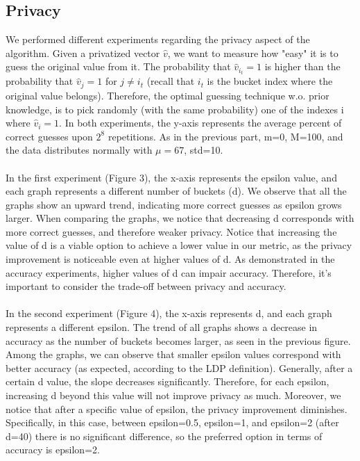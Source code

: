 \documentclass[sigconf]{acmart}
\begin{document}
\subsection{Privacy}  We performed different experiments regarding the privacy aspect of the algorithm. Given a privatized vector $\hat{v}$, we want to measure how "easy" it is to guess the original value from it. The probability that $\hat{v}_{i_t} =1$ is higher than the probability that $\hat{v}_{j} =1$ for $j \neq i_t$ (recall that $i_t$ is the bucket index where the original value belongs). Therefore, the optimal guessing technique w.o. prior knowledge, is to pick randomly (with the same probability) one of the indexes i where $\hat{v}_{i} =1$. In both experiments, the y-axis represents the average percent of correct guesses upon $2^{8}$ repetitions. As in the previous part, m=0, M=100, and the data distributes normally with $\mu=67$, std=10. \\\\
In the first experiment (Figure 3), the x-axis represents the epsilon value, and each graph represents a different number of buckets (d). We observe that all the graphs show an upward trend, indicating more correct guesses as epsilon grows larger. When comparing the graphs, we notice that decreasing d corresponds with more correct guesses, and therefore weaker privacy. Notice that increasing the value of d is a viable option to achieve a lower value in our metric, as the privacy improvement is noticeable even at higher values of d. As demonstrated in the accuracy experiments, higher values of d can impair accuracy. Therefore, it's important to consider the trade-off between privacy and accuracy.
\\\\
In the second experiment (Figure 4), the x-axis represents d, and each graph represents a different epsilon. The trend of all graphs shows a decrease in accuracy as the number of buckets becomes larger, as seen in the previous figure. Among the graphs, we can observe that smaller epsilon values correspond with better accuracy (as expected, according to the LDP definition). Generally, after a certain d value, the slope decreases significantly. Therefore, for each epsilon, increasing d beyond this value will not improve privacy as much. Moreover, we notice that after a specific value of epsilon, the privacy improvement diminishes. Specifically, in this case, between epsilon=0.5, epsilon=1, and epsilon=2 (after d=40) there is no significant difference, so the preferred option in terms of accuracy is epsilon=2.
    
\end{document}
